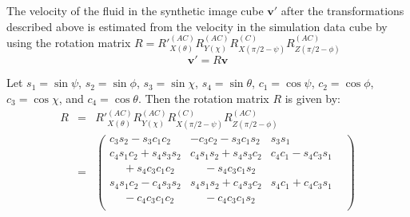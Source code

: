 \begin{appendices}
The velocity of the fluid in the synthetic image cube $\textbf{v}'$ after the transformations described above is estimated from the velocity in the simulation data cube by using the rotation matrix $R = R'^{(AC)}_{X(\theta)} R^{(AC)}_{Y(\chi)} R^{(C)}_{X(\pi/2 - \psi)} R^{(AC)}_{Z(\pi/2 - \phi)}$
\begin{equation}
\textbf{v}' = R \textbf{v}
\end{equation}

Let $s_1 = \sin \psi$, $s_2 = \sin \phi$, $s_3 = \sin \chi$, $s_4 = \sin \theta$, $c_1 = \cos \psi$,  $c_2 = \cos \phi$, $c_3 = \cos \chi$, and $c_4 = \cos\theta$. Then the rotation matrix $R$ is given by:
 \begin{eqnarray}
  R &=&  R'^{(AC)}_{X(\theta)} R^{(AC)}_{Y(\chi)} R^{(C)}_{X(\pi/2 - \psi)} R^{(AC)}_{Z(\pi/2 - \phi)} \nonumber \\
  &=&  \begin{pmatrix}
  c_3 s_2 - s_3 c_1 c_2  & -c_3 c_2 -s_3 c_1 s_2 & s_3 s_1 \\[6pt]
  c_4 s_1 c_2 + s_4 s_3 s_2  &  c_4 s_1 s_2 + s_4 s_3 c_2 & c_4 c_1 - s_4 c_3 s_1  \\
\phantom{{}+{}}+ s_4 c_3 c_1 c_2 & \phantom{{}+{}}- s_4 c_3 c_1 s_2  & & \\[6pt]
   s_4 s_1 c_2 - c_4 s_3 s_2 & s_4 s_1 s_2 + c_4 s_3 c_2  &  s_4 c_1 + c_4 c_3 s_1 \\
\phantom{{}+{}} - c_4 c_3 c_1c_2   &\phantom{{}+{}}-c_4 c_3 c_1 s_2  & & \\
\end{pmatrix} \nonumber 
\end{eqnarray}



\end{appendices}
